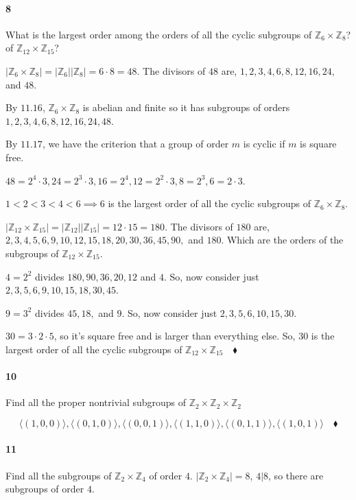\documentclass{article}
\newcommand\Z{\mathbb{Z}}
\begin{document}
\paragraph{8} What is the largest order among the orders of all the
cyclic subgroups of $\Z_6\times\Z_8$? of $\Z_{12}\times\Z_{15}$?


$|\Z_6\times\Z_8| = |\Z_6||\Z_8| = 6\cdot 8 = 48$. The divisors of $48$ are,
$1,2,3,4,6,8,12,16,24,$ and $48$.

By $11.16$, $\Z_{6}\times\Z_{8}$ is abelian and finite so it has subgroups of orders $1,2,3,4,6,8,12,16,24,48$.

By $11.17$, we have the criterion that a group of order $m$ is cyclic
if $m$ is square free.

$48 = 2^4\cdot 3, 24 = 2^3\cdot 3, 16 = 2^4, 12 = 2^2\cdot 3, 8 = 2^3,
6 = 2\cdot 3$.

$1 < 2 < 3 < 4 < 6 \implies 6$ is the largest order of all the cyclic
subgroups of $\Z_6\times \Z_8.$

$|\Z_{12}\times\Z_{15}| = |\Z_{12}||\Z_{15}| = 12\cdot 15 = 180$. The divisors of $180$ are,
$2,3,4,5,6,9,10,12,15,18,20,30,36,45,90,$ and $180$. Which are the
orders of the subgroups of $\Z_{12}\times\Z_{15}.$

$4 = 2^2$ divides $180,90,36,20,12$ and $4$. So, now consider just
$2,3,5,6,9,10,15,18,30,45$.

$9 = 3^2$ divides $45,18,$ and $9$. So, now consider just
$2,3,5,6,10,15,30$.

$30 = 3\cdot 2\cdot 5$, so it's square free and is larger than
everything else. So, $30$ is the largest order of all the cyclic
subgroups of $\Z_{12}\times \Z_{15}\quad \blacklozenge$



\paragraph{10} Find all the proper nontrivial subgroups of
$\Z_2\times\Z_2\times\Z_2$

$$\langle  (1,0,0)\rangle, \langle  (0,1,0)\rangle, \langle
(0,0,1)\rangle, \langle (1,1,0)\rangle, \langle (0,1,1)\rangle,\langle (1,0,1) \rangle \quad \blacklozenge$$

\paragraph{11} Find all the subgroups of $\Z_2\times \Z_4$ of order
$4$.
$|\Z_2\times \Z_4|= 8$, $4|8$, so there are subgroups of order $4$.
\end{document}
